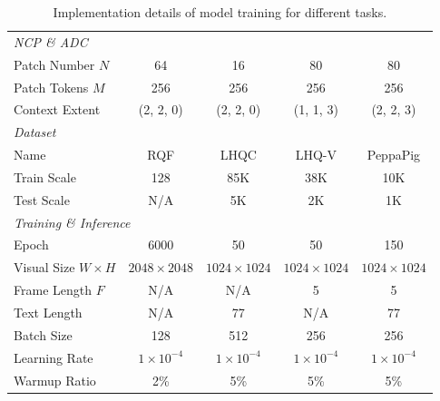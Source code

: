\documentclass{article}
\begin{document}
\begin{table}[t]
\begin{tabular}{lcccc}
\midrule
\multicolumn{5}{l}{\textit{NCP \& ADC}}\\
Patch Number $N$ & 64 & 16 & 80 & 80\\
Patch Tokens $M$ & 256 & 256 & 256 & 256\\
Context Extent       & (2, 2, 0)       & (2, 2, 0)               & (1, 1, 3)       & (2, 2, 3)              \\
\midrule
\multicolumn{5}{l}{\textit{Dataset}}\\
Name                      & RQF                & LHQC               & LHQ-V                & PeppaPig                \\
Train Scale              & 128                 & 85K                  & 38K                 & 10K                  \\
Test Scale                  & N/A                  & 5K                    & 2K                  & 1K                   \\
\midrule
\multicolumn{5}{l}{\textit{Training \& Inference}}\\
Epoch               & 6000                  & 50                   & 50                  & 150                   \\
Visual Size $W \times H$            & $2048\times 2048$         & $1024\times 1024$          & $1024\times 1024$         & $1024\times 1024$          \\
Frame Length $F$ & N/A & N/A & 5 & 5 \\
Text Length              & N/A              & 77                 & N/A               & 77                 \\
Batch Size                   & 128                 & 512                  & 256                 & 256                 \\
Learning Rate                &$1\times 10^{-4}$                & $1\times 10^{-4}$                 &$1\times 10^{-4}$                & $1\times 10^{-4}$                 \\
Warmup Ratio                 & 2\%                 & 5\%                 & 5\%                 & 5\%                 \\
\bottomrule
\end{tabular}
\caption{Implementation details of model training for different tasks. %
}
\label{tab:implementation_details}
\end{table}
\end{document}
